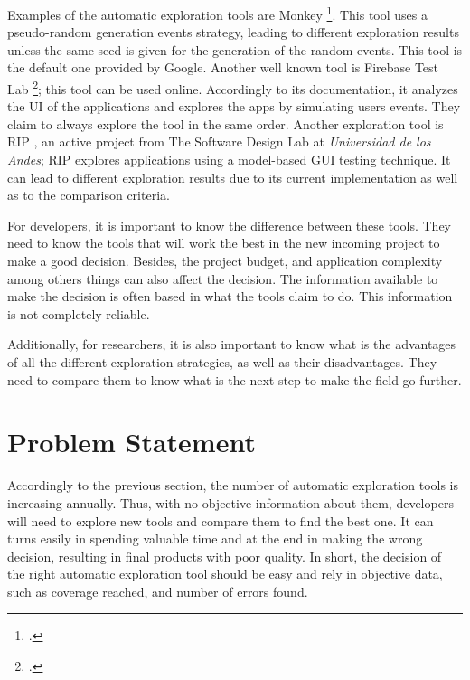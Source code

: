 Examples of the automatic exploration tools are Monkey \footcite{https://developer.android.com/studio/test/monkey}. This tool uses a pseudo-random generation events strategy, leading to different exploration results unless the same seed is given for the generation of the random events. This tool is the default one provided by Google. Another well known tool is Firebase Test Lab \footcite{https://firebase.google.com/}; this tool can be used online. Accordingly to its documentation, it analyzes the UI of the applications and explores the apps by simulating users events. They claim to always explore the tool in the same order. Another exploration tool is RIP , an active project from  The Software Design Lab at \emph{Universidad de los Andes}; RIP explores applications using a model-based GUI testing technique. It can lead to different exploration results due to its current implementation as well as to the comparison criteria. 

For developers, it  is important to know the difference between these tools. They need to know the tools that will work the best in the new incoming project to make a good decision. Besides, the project budget, and application complexity among others things can also affect the decision. The information available to make the decision is often based in what the tools claim to do. This information is not completely reliable.

Additionally, for researchers, it is also important to know what is the advantages of all the different exploration strategies, as well as their disadvantages. They need to compare them to know what is the next step to make the field go further.


\section{Problem Statement}

Accordingly to the previous section, the number of automatic exploration tools is increasing annually. Thus, with no objective information about them, developers  will need to explore new tools and compare them to find the best one. It can turns easily in spending valuable time and at the end in making the wrong decision, resulting in final products with poor quality. In short, the decision of the right automatic exploration tool should be easy and rely in objective data, such as coverage reached, and number of errors found.

